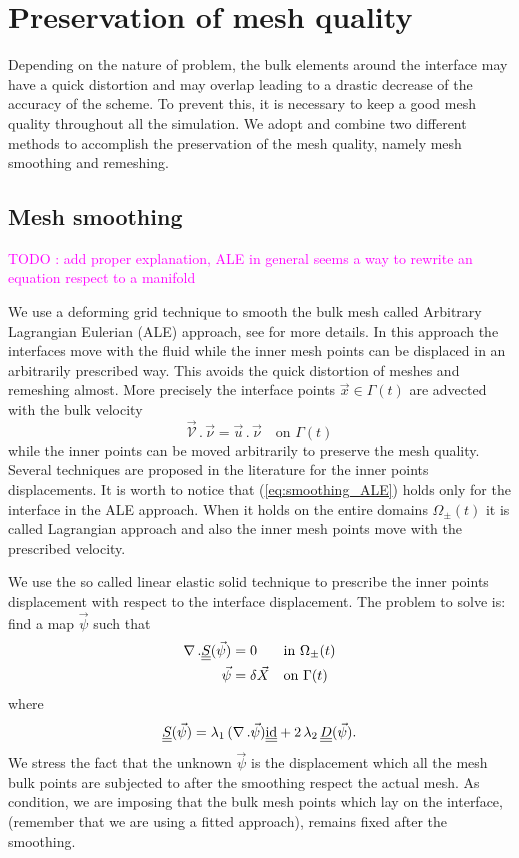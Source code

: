 \documentclass[a4paper,12pt,onecolumn]{article}
\newcommand{\id}{\rm id}
\newcommand{\mat}[1]{\underline{\underline{#1}}\rule{0pt}{0pt}}
\begin{document}
\section{Preservation of mesh quality}

Depending on the nature of problem, the bulk elements around the interface may
have a quick distortion and may overlap leading to a drastic decrease of the
accuracy of the scheme. To prevent this, it is necessary to keep a good mesh
quality throughout all the simulation. We adopt and combine two different
methods to accomplish the preservation of the mesh quality, namely mesh
smoothing and remeshing.

\subsection{Mesh smoothing} \label{subsec:smoothing}

\textcolor{magenta}{TODO : add proper explanation, ALE in general seems a way
to rewrite an equation respect to a manifold}

We use a deforming grid technique to smooth the bulk mesh called Arbitrary
Lagrangian Eulerian (ALE) approach, see \cite{GanesanPhd} for more details. In
this approach the interfaces move with the fluid while the inner mesh points can
be displaced in an arbitrarily prescribed way. This avoids the quick distortion
of meshes and remeshing almost. More precisely the interface points $\vec x \in
\Gamma(t)$ are advected with the bulk velocity
\begin{equation}\label{eq:smoothing_ALE}
\vec{\mathcal{V}}\,.\,\vec\nu = \vec u\,.\,\vec \nu\quad \mbox{on }\Gamma(t)
\end{equation}
while the inner points can be moved arbitrarily to preserve the mesh quality.
Several techniques are proposed in the literature for the inner points
displacements. It is worth to notice that (\ref{eq:smoothing_ALE}) holds only
for the interface in the ALE approach. When it holds on the entire domains
$\Omega_{\pm}(t)$ it is called Lagrangian approach and also the inner mesh
points move with the prescribed velocity.

We use the so called linear elastic solid technique to prescribe the inner
points displacement with respect to the interface displacement. The problem to
solve is: find a map $\vec \psi$ such that
\begin{align}
 \nabla\,.\mat S(\vec \psi) &= 0 && \mbox{in }\Omega_{\pm}(t)\\
 \vec \psi &= \delta \vec X && \mbox{on } \Gamma(t)
\end{align}
where
\begin{equation} \label{eq:elasticity_tensor}
\mat S(\vec \psi) = \lambda_1 \,(\nabla\,.\vec\psi)\mat\id + 2\,\lambda_2\,
\mat D(\vec\psi).
\end{equation}
We stress the fact that the unknown $\vec\psi$ is the displacement which all
the mesh bulk points are subjected to after the smoothing respect the actual
mesh. As condition, we are imposing that the bulk mesh points which lay on the
interface, (remember that we are using a fitted approach), remains fixed after
the smoothing.
\end{document}
